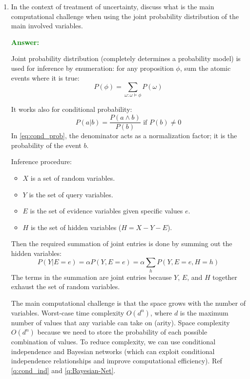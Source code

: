 \documentclass[12pt]{article}
\begin{document}
\begin{enumerate}[label=\textbf{U.\arabic*}]
    \item\label{q:joint-prob} In the context of treatment of uncertainty, discuss what is the main computational challenge when using the joint probability distribution of the main involved variables.

          \textcolor{green}{\textbf{Answer:}}

          Joint probability distribution (completely determines a probability model) is used for inference by enumeration: for any proposition $\phi$, sum the atomic events where it is true:
          \begin{equation}
              P(\phi) = \sum_{\omega : \omega \vDash \phi} P(\omega)
          \end{equation}

          It works also for conditional probability:
          \begin{equation}\label{eq:cond_prob}
              P(a | b) = \frac{P(a \land b)}{P(b)} \text{ if } P(b) \neq 0
          \end{equation}
          In \ref{eq:cond_prob}, the denominator acts as a normalization factor; it is the probability of the event $b$.

          Inference procedure:
          \begin{itemize}
              \item $X$ is a set of random variables.
              \item $Y$ is the set of query variables.
              \item $E$ is the set of evidence variables given specific values $e$.
              \item $H$ is the set of hidden variables ($H = X - Y - E$).
          \end{itemize}
          Then the required summation of joint entries is done by summing out the hidden variables:
          \begin{equation}
              P(Y | E = e) = \alpha P(Y, E = e) = \alpha\sum_{h} P(Y, E = e, H = h)
          \end{equation}
          The terms in the summation are joint entries because $Y$, $E$, and $H$ together exhaust the set of random variables.

          The main computational challenge is that the space grows with the number of variables. Worst-case time complexity $O(d^n)$, where $d$ is the maximum number of values that any variable can take on (arity). Space complexity $O(d^n)$ because we need to store the probability of each possible combination of values. To reduce complexity, we can use conditional independence and Bayesian networks (which can exploit conditional independence relationships and improve computational efficiency). Ref \ref{q:cond_ind} and \ref{q:Bayesian-Net}.


\end{enumerate}
\end{document}
